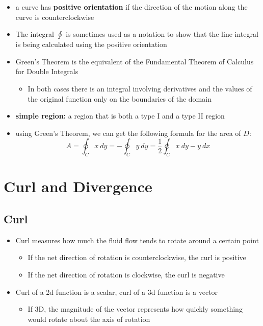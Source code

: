 \documentclass{package/notes}
\begin{document}
\begin{itemize}
	\item a curve has \textbf{positive orientation} if the direction of the motion along the curve is counterclockwise
	\item The integral $\oint$ is sometimes used as a notation to show that the line integral is being calculated using the positive orientation
	\item Green's Theorem is the equivalent of the Fundamental Theorem of Calculus for Double Integrals
	\begin{itemize}
		\item In both cases there is an integral involving derivatives and the values of the original function only on the boundaries of the domain
	\end{itemize}
	\item \textbf{simple region:} a region that is both a type I and a type II region
	\item using Green's Theorem, we can get the following formula for the area of $D$:
	$$A = \oint_C x\:dy=-\oint_C y\:dy=\frac{1}{2}\oint_Cx\:dy-y\:dx$$
\end{itemize}



\section{Curl and Divergence}


\subsection{Curl}

\begin{itemize}
	\item Curl measures how much the fluid flow tends to rotate around a certain point
	\begin{itemize}
		\item If the net direction of rotation is counterclockwise, the curl is positive
		\item If the net direction of rotation is clockwise, the curl is negative
	\end{itemize}
	\item Curl of a 2d function is a scalar, curl of a 3d function is a vector
	\begin{itemize}
		\item If 3D, the magnitude of the vector represents how quickly something would rotate about the axis of rotation
	\end{itemize}
\end{itemize}
\end{document}
